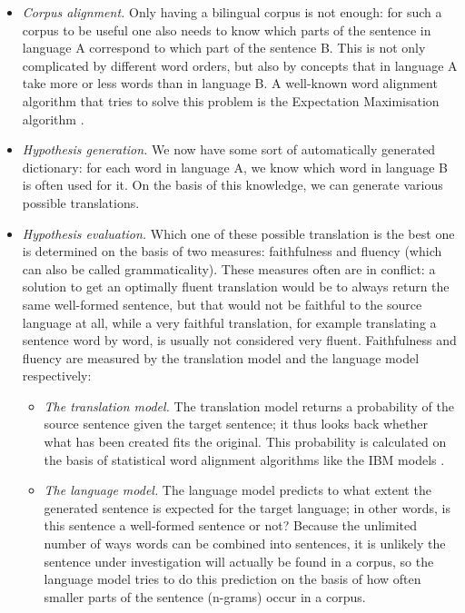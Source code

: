 \documentclass[12pt]{article}
\begin{document}
\begin{itemize}
\item \emph{Corpus alignment.} Only having a bilingual corpus is not enough: for such a corpus to be useful one also needs to know which parts of the sentence in language A correspond to which part of the sentence B. This is not only complicated by different word orders, but also by concepts that in language A take more or less words than in language B. A well-known word alignment algorithm that tries to solve this problem is the Expectation Maximisation algorithm \citep{dempster77}. 


\item \emph{Hypothesis generation.} We now have some sort of automatically generated dictionary: for each word in language A, we know which word in language B is often used for it. On the basis of this knowledge, we can generate various possible translations. 

\item \emph{Hypothesis evaluation.} Which one of these possible translation is the best one is determined on the basis of two measures: faithfulness and fluency (which can also be called grammaticality). These measures often are in conflict: a solution to get an optimally fluent translation would be to always return the same well-formed sentence, but that would not be faithful to the source language at all, while a very faithful translation, for example translating a sentence word by word, is usually not considered very fluent. Faithfulness and fluency are measured by the translation model and the language model respectively:

\begin{itemize}
\item \emph{The translation model.} The translation model returns a probability of the source sentence given the target sentence; it thus looks back whether what has been created fits the original. This probability is calculated on the basis of statistical word alignment algorithms like the IBM models \citep{brown93}.

\item \emph{The language model.} The language model predicts to what extent the generated sentence is expected for the target language; in other words, is this sentence a well-formed sentence or not? Because the unlimited number of ways words can be combined into sentences, it is unlikely the sentence under investigation will actually be found in a corpus, so the language model tries to do this prediction on the basis of how often smaller parts of the sentence (n-grams) occur in a corpus.

\end{itemize}

\end{itemize}
\end{document}

